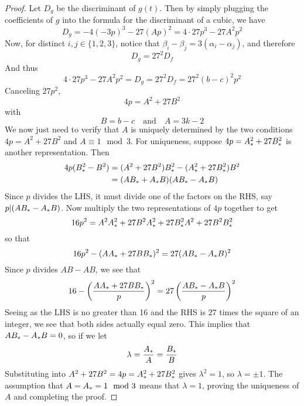 \begin{proof}
Let $D_g$ be the discriminant of $g(t)$.
Then by simply plugging the coefficients of $g$ into the formula for the discriminant of a cubic, we have
$$D_g = -4(-3p)^3 - 27(Ap)^2 = 4 \cdot 27p^3 - 27A^2p^2$$
Now, for distinct $i,j \in \{1,2,3\}$, notice that $\beta_i - \beta_j = 3(\alpha_i - \alpha_j)$, and therefore
$$D_g = 27^2 D_f$$
And thus
$$4 \cdot 27p^3 - 27A^2p^2 = D_g = 27^2 D_f = 27^2 (b-c)^2p^2$$
Canceling $27p^2$,
$$4p = A^2 + 27B^2$$
with
$$B = b-c\quad \text{and}\quad A = 3k-2$$
We now just need to verify that $A$ is uniquely determined by the two conditions $4p = A^2 + 27B^2$ and $A \equiv 1 \mod 3$.
For uniqueness, suppose $4p = {A}_{\ast}^2 + 27{B}_{\ast}^2$ is another representation.
Then
\begin{align*}
	4p(B_\ast^2 - B^2) &= (A^2 + 27B^2){B}_{\ast}^2 - ({A}_{\ast}^2 + 27{B}_{\ast}^2)B^2\\
	&= (A{B}_{\ast} + {A}_{\ast}B)(A{B}_{\ast} - {A}_{\ast}B)
\end{align*}
Since $p$ divides the LHS, it must divide one of the factors on the RHS, say $p|(A{B}_{\ast} - {A}_{\ast}B)$.
Now multiply the two representations of $4p$ together to get
$$16p^2 = A^2{A}_{\ast}^2 + 27B^2{A}_{\ast}^2 + 27{B}_{\ast}^2A^2 + 27B^2{B}_{\ast}^2$$
so that
$$16p^2 - (A{A}_{\ast} + 27B{B}_{\ast})^2 = 27(A{B}_{\ast} - {A}_{\ast}B)^2$$
Since $p$ divides $AB - AB$, we see that
$$16 - \left(\frac{A{A}_{\ast} + 27B{B}_{\ast}}{p}\right)^2 = 27\left(\frac{A{B}_{\ast}-{A}_{\ast}B}{p}\right)^2$$
Seeing as the LHS is no greater than 16 and the RHS is $27$ times the square of an integer, we see that both sides actually equal zero.
This implies that $A{B}_{\ast} - {A}_{\ast}B = 0$, so if we let
$$\lambda = \frac{{A}_{\ast}}{A} = \frac{{B}_{\ast}}{B}$$
Substituting into $A^2 + 27B^2 = 4p = {A}_{\ast}^2 + 27{B}_{\ast}^2$ gives $\lambda^2 = 1$, so $\lambda = \pm 1$.
The assumption that $A = {A}_{\ast} = 1 \mod 3$ means that $\lambda = 1$, proving the uniqueness of $A$ and completing the proof.
\end{proof}
